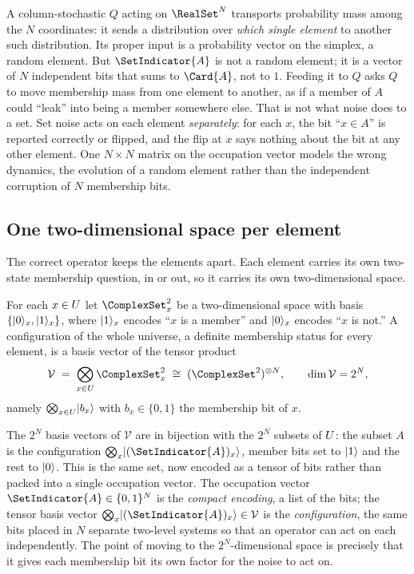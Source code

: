 A column-stochastic $Q$ acting on $\RealSet^{N}$ transports probability mass
among the $N$ coordinates: it sends a distribution over \emph{which single
element} to another such distribution. Its proper input is a probability vector
on the simplex, a random element. But $\SetIndicator{A}$ is not a random
element; it is a vector of $N$ independent bits that sums to $\Card{A}$, not to
$1$. Feeding it to $Q$ asks $Q$ to move membership mass from one element to
another, as if a member of $A$ could ``leak'' into being a member somewhere
else. That is not what noise does to a set. Set noise acts on each element
\emph{separately}: for each $x$, the bit ``$x \in A$'' is reported correctly or
flipped, and the flip at $x$ says nothing about the bit at any other element.
One $N \times N$ matrix on the occupation vector models the wrong dynamics, the
evolution of a random element rather than the independent corruption of $N$
membership bits.

\subsection*{One two-dimensional space per element}

The correct operator keeps the elements apart. Each element carries its own
two-state membership question, in or out, so it carries its own two-dimensional
space.

\begin{definition}
\label{def:membership-space}
For each $x \in U$ let $\ComplexSet^{2}_{x}$ be a two-dimensional space
with basis $\{\lvert 0 \rangle_x, \lvert 1 \rangle_x\}$, where $\lvert 1 \rangle_x$ encodes ``$x$ is a
member'' and $\lvert 0 \rangle_x$ encodes ``$x$ is not.'' A configuration of the whole
universe, a definite membership status for every element, is a basis vector of
the tensor product
\[
  \mathcal{V} \;=\; \bigotimes_{x \in \Universe} \ComplexSet^{2}_{x}
  \;\cong\; (\ComplexSet^{2})^{\otimes N},
  \qquad
  \dim \mathcal{V} = 2^{N},
\]
namely $\bigotimes_{x \in U} \lvert b_x \rangle$ with $b_x \in \{0, 1\}$ the
membership bit of $x$.
\end{definition}

The $2^N$ basis vectors of $\mathcal{V}$ are in bijection with the $2^N$ subsets
of $U$: the subset $A$ is the configuration $\bigotimes_x \ket{(
\SetIndicator{A})_x}$, member bits set to $\lvert 1 \rangle$ and the rest to $\lvert 0 \rangle$.
This is the same set, now encoded as a tensor of bits rather than packed into a
single occupation vector. The occupation vector $\SetIndicator{A} \in
\{0,1\}^N$ is the \emph{compact encoding}, a list of the bits; the tensor basis
vector $\bigotimes_x \ket{(\SetIndicator{A})_x} \in \mathcal{V}$ is the
\emph{configuration}, the same bits placed in $N$ separate two-level systems so
that an operator can act on each independently. The point of moving to the
$2^N$-dimensional space is precisely that it gives each membership bit its own
factor for the noise to act on.

